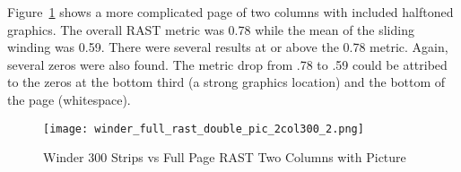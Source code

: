 \documentclass[conference]{IEEEtran}
\begin{document}


Figure~\ref{fig:winder-300-double-pic-2col300} shows a more complicated page of
two columns with included halftoned graphics. The overall RAST metric was 0.78
while the mean of the sliding winding was 0.59. There were several results at
or above the 0.78 metric. Again, several zeros were also found. The metric drop
from .78 to .59 could be attribed to the zeros at the bottom third (a strong
graphics location) and the bottom of the page (whitespace).

\begin{figure}[winder-300-double-pic-2col300]
\texttt{[image: winder\_full\_rast\_double\_pic\_2col300\_2.png]}
\caption{Winder 300 Strips vs Full Page RAST Two Columns with Picture}
\label{fig:winder-300-double-pic-2col300}
\end{figure}




%
%
\end{document}
